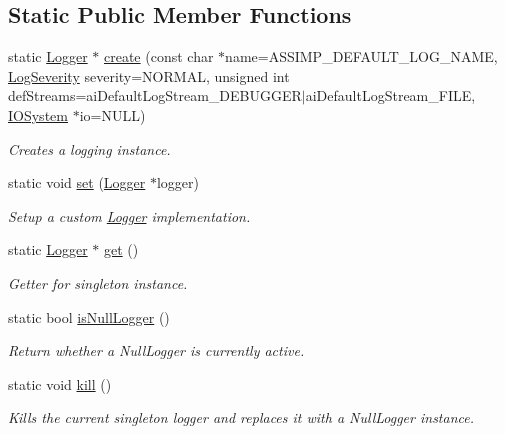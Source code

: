 \subsection*{Static Public Member Functions}
\begin{CompactItemize}
\item 
static \hyperlink{class_assimp_1_1_logger}{Logger} $\ast$ \hyperlink{class_assimp_1_1_default_logger_dccb11f85f8b0ef226c382e11ba665c3}{create} (const char $\ast$name=ASSIMP\_\-DEFAULT\_\-LOG\_\-NAME, \hyperlink{class_assimp_1_1_logger_8b6248a0fd062431e8572556350d29e6}{LogSeverity} severity=NORMAL, unsigned int defStreams=aiDefaultLogStream\_\-DEBUGGER$|$aiDefaultLogStream\_\-FILE, \hyperlink{class_assimp_1_1_i_o_system}{IOSystem} $\ast$io=NULL)
\begin{CompactList}\small\item\em Creates a logging instance. \item\end{CompactList}\item 
static void \hyperlink{class_assimp_1_1_default_logger_9daba548026045b99813c760c2842ed2}{set} (\hyperlink{class_assimp_1_1_logger}{Logger} $\ast$logger)
\begin{CompactList}\small\item\em Setup a custom \hyperlink{class_assimp_1_1_logger_784e6d1a741072b17bab32a6a41055e8}{Logger} implementation. \item\end{CompactList}\item 
static \hyperlink{class_assimp_1_1_logger}{Logger} $\ast$ \hyperlink{class_assimp_1_1_default_logger_7d0a53f2db66945ade30094330a77ba4}{get} ()
\begin{CompactList}\small\item\em Getter for singleton instance. \item\end{CompactList}\item 
static bool \hyperlink{class_assimp_1_1_default_logger_bebc7ee702a2a2dde765e771948400c6}{isNullLogger} ()
\begin{CompactList}\small\item\em Return whether a NullLogger is currently active. \item\end{CompactList}\item 
\hypertarget{class_assimp_1_1_default_logger_0b1da096d7442af5a4a4cb5ebb2540f7}{
static void \hyperlink{class_assimp_1_1_default_logger_0b1da096d7442af5a4a4cb5ebb2540f7}{kill} ()}
\label{class_assimp_1_1_default_logger_0b1da096d7442af5a4a4cb5ebb2540f7}

\begin{CompactList}\small\item\em Kills the current singleton logger and replaces it with a NullLogger instance. \item\end{CompactList}\end{CompactItemize}


